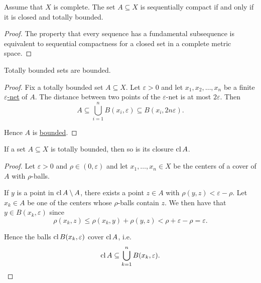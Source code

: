 \begin{corollary}\label{thm:metric_space_compact_iff_closed_totally_bounded}
  Assume that \( X \) is complete. The set \( A \subseteq X \) is sequentially compact if and only if it is closed and totally bounded.
\end{corollary}
\begin{proof}
  The property that every sequence has a fundamental subsequence is equivalent to sequential compactness for a closed set in a complete metric space.
\end{proof}

\begin{proposition}\label{thm:totally_bounded_sets_are_bounded}
  Totally bounded sets are bounded.
\end{proposition}
\begin{proof}
  Fix a totally bounded set \( A \subseteq X \). Let \( \varepsilon > 0 \) and let \( x_1, x_2, \ldots, x_n \) be a finite \hyperref[def:totally_bounded_set/epsilon_net]{\( \varepsilon \)-net} of \( A \). The distance between two points of the \( \varepsilon \)-net is at most \( 2\varepsilon \). Then
  \begin{equation*}
    A \subseteq \bigcup_{i=1}^n B(x_i, \varepsilon) \subseteq B(x_i, 2 n \varepsilon).
  \end{equation*}

  Hence \( A \) is \hyperref[def:metric_space/bounded_set]{bounded}.
\end{proof}

\begin{proposition}\label{thm:closure_of_totally_bounded_is_totally_bounded}
  If a set \( A \subseteq X \) is totally bounded, then so is its closure \( \operatorname{cl} A \).
\end{proposition}
\begin{proof}
  Let \( \varepsilon > 0 \) and \( \rho \in (0, \varepsilon) \) and let \( x_1, \ldots, x_n \in X \) be the centers of a cover of \( A \) with \( \rho \)-balls.

  If \( y \) is a point in \( \operatorname{cl} A \setminus A \), there exists a point \( z \in A \) with \( \rho(y, z) < \varepsilon - \rho \). Let \( x_k \in A \) be one of the centers whose \( \rho \)-balls contain \( z \). We then have that \( y \in B(x_k, \varepsilon) \) since
  \begin{equation*}
    \rho(x_k, z) \leq \rho(x_k, y) + \rho(y, z) < \rho + \varepsilon - \rho = \varepsilon.
  \end{equation*}

  Hence the balls \( \operatorname{cl} B(x_k, \varepsilon) \) cover \( \operatorname{cl} A \), i.e.
  \begin{equation*}
    \operatorname{cl} A \subseteq \bigcup_{k=1}^n B(x_k, \varepsilon).
  \end{equation*}
\end{proof}

